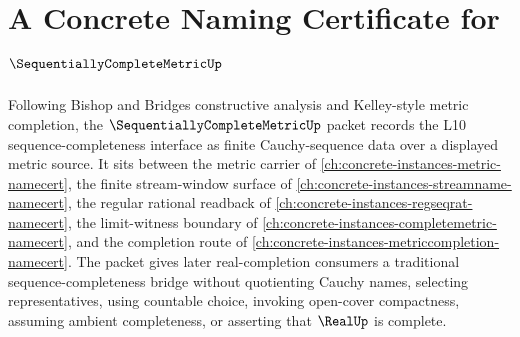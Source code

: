 \chapter{A Concrete Naming Certificate for $\SequentiallyCompleteMetricUp$}
\label{ch:concrete-instances-sequentiallycompletemetric-namecert}

Following Bishop and Bridges constructive analysis and Kelley-style metric completion, the $\SequentiallyCompleteMetricUp$ packet records the L10 sequence-completeness interface as finite Cauchy-sequence data over a displayed metric source. It sits between the metric carrier of \autoref{ch:concrete-instances-metric-namecert}, the finite stream-window surface of \autoref{ch:concrete-instances-streamname-namecert}, the regular rational readback of \autoref{ch:concrete-instances-regseqrat-namecert}, the limit-witness boundary of \autoref{ch:concrete-instances-completemetric-namecert}, and the completion route of \autoref{ch:concrete-instances-metriccompletion-namecert}. The packet gives later real-completion consumers a traditional sequence-completeness bridge without quotienting Cauchy names, selecting representatives, using countable choice, invoking open-cover compactness, assuming ambient completeness, or asserting that $\RealUp$ is complete.

